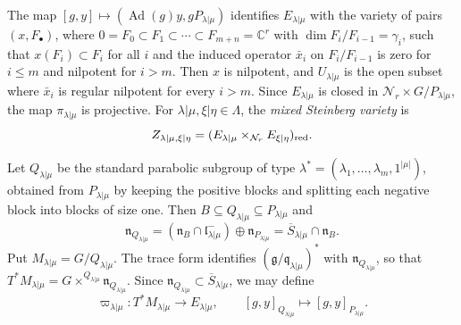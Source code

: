 \documentclass[11pt,a4paper]{amsart}
\theoremstyle{definition}
\theoremstyle{remark}
\newcommand{\C}{\mathbb C}
\newcommand{\N}{\mathcal N}
\newcommand{\Ad}{\operatorname{Ad}}
\newcommand{\lm}{\lambda|\mu}
\newcommand{\xh}{\xi|\eta}
\numberwithin{equation}{section}
\begin{document}
The map $[g,y]\mapsto(\Ad(g)y,gP_{\lm})$ identifies $E_{\lm}$ with the
variety of pairs $(x,F_\bullet)$, where
$0=F_0\subset F_1\subset\cdots\subset F_{m+n}=\C^r$ with
$\dim F_i/F_{i-1}=\gamma_i$, such that $x(F_i)\subset F_i$ for all $i$
and the induced operator $\bar x_i$ on $F_i/F_{i-1}$ is zero for
$i\le m$ and nilpotent for $i>m$. Then $x$ is nilpotent, and $U_{\lm}$
is the open subset where $\bar x_i$ is regular nilpotent for every
$i>m$. Since $E_{\lm}$ is closed in $\N_r\times G/P_{\lm}$, the map
$\pi_{\lm}$ is projective. For $\lm,\xh\in\Lambda$, the
\emph{mixed Steinberg variety} is
$$
Z_{\lm,\xh}=(E_{\lm}\times_{\N_r}E_{\xh})_{\rm red}.
$$

Let $Q_{\lm}$ be the standard parabolic subgroup of type
$\lambda^*=(\lambda_1,\ldots,\lambda_m,1^{|\mu|})$, obtained from
$P_{\lm}$ by keeping the positive blocks and splitting each negative
block into blocks of size one. Then $B\subseteq Q_{\lm}\subseteq P_{\lm}$
and
$$
\mathfrak n_{Q_{\lm}}
=(\mathfrak n_B\cap\mathfrak l_{\lm}^-)\oplus\mathfrak n_{P_{\lm}}
=\overline S_{\lm}\cap\mathfrak n_B.
$$
Put $M_{\lm}=G/Q_{\lm}$. The trace form identifies
$(\mathfrak g/\mathfrak q_{\lm})^*$ with $\mathfrak n_{Q_{\lm}}$, so that
$T^*M_{\lm}=G\times^{Q_{\lm}}\mathfrak n_{Q_{\lm}}$. Since
$\mathfrak n_{Q_{\lm}}\subset\overline S_{\lm}$, we may define
\begin{equation}\label{eq:cotangent-resolution}
\varpi_{\lm}:T^*M_{\lm}\longrightarrow E_{\lm},\qquad
[g,y]_{Q_{\lm}}\longmapsto[g,y]_{P_{\lm}}.
\end{equation}
\end{document}
